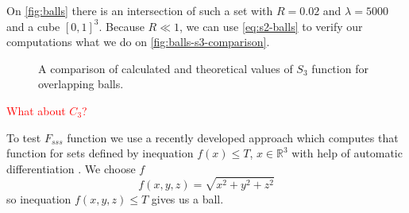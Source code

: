 \documentclass[1p]{elsarticle}
\begin{document}
On \cref{fig:balls} there is an intersection of such a set with $R = 0.02$ and
$\lambda=5000$ and a cube $[0, 1]^3$. Because $R \ll 1$, we can use
\cref{eq:s2-balls} to verify our computations what we do on
\cref{fig:balls-s3-comparison}.
\begin{figure}[tp]
  \centering
  \hfill
  \caption[]{A comparison of calculated and theoretical values of $S_3$ function
    for overlapping balls.}
  \label{fig:s3-verification}
\end{figure}

\textcolor{red}{What about $C_3$?}

To test $F_{sss}$ function we use a recently developed approach which computes
that function for sets defined by inequation $f(x) \le T$, $x \in \mathbb{R}^3$
with help of automatic differentiation \cite{postnicov20232}. We choose $f$
\begin{equation}
  f(x, y, z) = \sqrt{x^2 + y^2 + z^2}
\end{equation}
so inequation $f(x, y, z) \le T$ gives us a ball.
\end{document}
